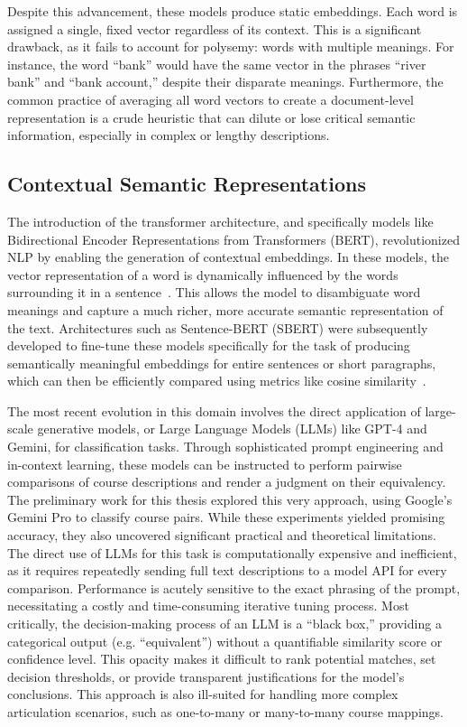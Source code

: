 \begin{introduction}
    Despite this advancement, these models produce static embeddings. Each word is assigned a single, fixed vector regardless of its context. This is a significant drawback, as it fails to account for polysemy: words with multiple meanings. For instance, the word ``bank'' would have the same vector in the phrases ``river bank'' and ``bank account,'' despite their disparate meanings. Furthermore, the common practice of averaging all word vectors to create a document-level representation is a crude heuristic that can dilute or lose critical semantic information, especially in complex or lengthy descriptions.

    \subsection{Contextual Semantic Representations}
    The introduction of the transformer architecture, and specifically models like Bidirectional Encoder Representations from Transformers (BERT), revolutionized NLP by enabling the generation of contextual embeddings. In these models, the vector representation of a word is dynamically influenced by the words surrounding it in a sentence~\cite{devlin2019bertpretrainingdeepbidirectional}. This allows the model to disambiguate word meanings and capture a much richer, more accurate semantic representation of the text. Architectures such as Sentence-BERT (SBERT) were subsequently developed to fine-tune these models specifically for the task of producing semantically meaningful embeddings for entire sentences or short paragraphs, which can then be efficiently compared using metrics like cosine similarity~\cite{reimers2019sentencebertsentenceembeddingsusing}.

    The most recent evolution in this domain involves the direct application of large-scale generative models, or Large Language Models (LLMs) like GPT-4 and Gemini, for classification tasks. Through sophisticated prompt engineering and in-context learning, these models can be instructed to perform pairwise comparisons of course descriptions and render a judgment on their equivalency. The preliminary work for this thesis explored this very approach, using Google's Gemini Pro to classify course pairs. While these experiments yielded promising accuracy, they also uncovered significant practical and theoretical limitations. The direct use of LLMs for this task is computationally expensive and inefficient, as it requires repeatedly sending full text descriptions to a model API for every comparison. Performance is acutely sensitive to the exact phrasing of the prompt, necessitating a costly and time-consuming iterative tuning process. Most critically, the decision-making process of an LLM is a ``black box,'' providing a categorical output (e.g. ``equivalent'') without a quantifiable similarity score or confidence level. This opacity makes it difficult to rank potential matches, set decision thresholds, or provide transparent justifications for the model's conclusions. This approach is also ill-suited for handling more complex articulation scenarios, such as one-to-many or many-to-many course mappings.


\end{introduction}
